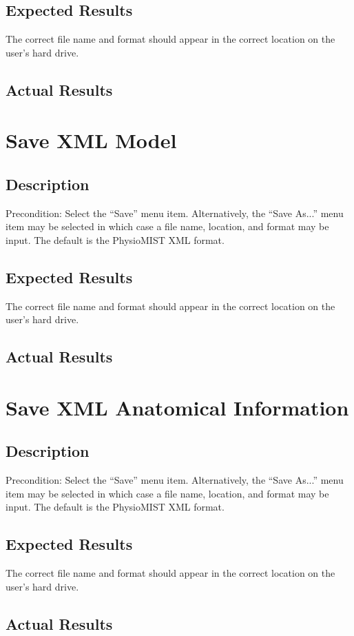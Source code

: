 \documentclass{article}
\begin{document}
\subsection{Expected Results}
The correct file name and format should appear in the correct location on the user's hard drive.
\subsection{Actual Results}

\section{Save XML Model}
\subsection{Description}
Precondition: Select the ``Save'' menu item.  Alternatively, the ``Save As...'' menu item may be selected in which case a file name, location, and format may be input.  The default is the PhysioMIST XML format.
\subsection{Expected Results}
The correct file name and format should appear in the correct location on the user's hard drive.
\subsection{Actual Results}

\section{Save XML Anatomical Information}
\subsection{Description}
Precondition: Select the ``Save'' menu item.  Alternatively, the ``Save As...'' menu item may be selected in which case a file name, location, and format may be input.  The default is the PhysioMIST XML format.
\subsection{Expected Results}
The correct file name and format should appear in the correct location on the user's hard drive.
\subsection{Actual Results}
\end{document}
